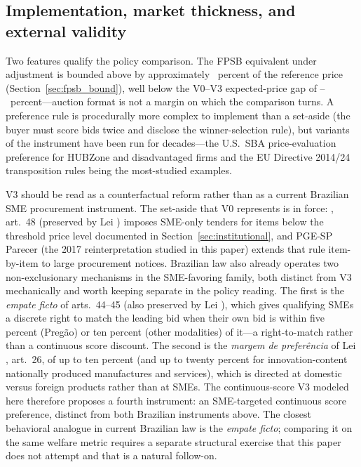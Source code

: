 \subsection{Implementation, market thickness, and external validity}

Two features qualify the policy comparison. The FPSB equivalent under \citet{maskinriley2000} adjustment is bounded above by approximately \maskinRileyBoundPct~percent of the reference price (Section~\ref{sec:fpsb_bound}), well below the V0--V3 expected-price gap of \vZeroVThreeGapLo--\vZeroVThreeGapHi~percent---auction format is not a margin on which the comparison turns. A preference rule is procedurally more complex to implement than a set-aside (the buyer must score bids twice and disclose the winner-selection rule), but variants of the instrument have been run for decades---the U.S.\ SBA price-evaluation preference for HUBZone and disadvantaged firms and the EU Directive 2014/24 transposition rules being the most-studied examples.

V3 should be read as a counterfactual reform rather than as a current Brazilian SME procurement instrument. The set-aside that V0 represents is in force: \LCSmeStatute{}, art.~48 (preserved by Lei \leiNova{}) imposes SME-only tenders for items below the threshold price level documented in Section~\ref{sec:institutional}, and PGE-SP Parecer \pareceNum{} (the 2017 reinterpretation studied in this paper) extends that rule item-by-item to large procurement notices. Brazilian law also already operates two non-exclusionary mechanisms in the SME-favoring family, both distinct from V3 mechanically and worth keeping separate in the policy reading. The first is the \emph{empate ficto} of \LCSmeStatute{} arts.~44--45 (also preserved by Lei \leiNova{}), which gives qualifying SMEs a discrete right to match the leading bid when their own bid is within five percent (Preg\~ao) or ten percent (other modalities) of it---a right-to-match rather than a continuous score discount. The second is the \emph{margem de prefer\^encia} of Lei \leiNova{}, art.~26, of up to ten percent (and up to twenty percent for innovation-content nationally produced manufactures and services), which is directed at domestic versus foreign products rather than at SMEs. The continuous-score V3 modeled here therefore proposes a fourth instrument: an SME-targeted continuous score preference, distinct from both Brazilian instruments above. The closest behavioral analogue in current Brazilian law is the \emph{empate ficto}; comparing it on the same welfare metric requires a separate structural exercise that this paper does not attempt and that is a natural follow-on.

